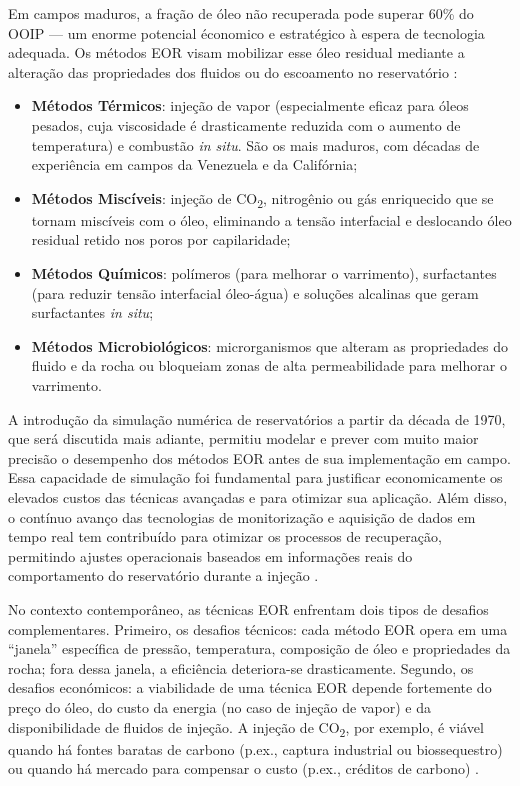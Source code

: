 \documentclass[
  12pt,
  a4paper,
  oneside,
  brazilian,
  sumario=tradicional
]{abntex2}
\begin{document}
Em campos maduros, a fração de óleo não recuperada pode superar 60\%
do OOIP — um enorme potencial économico e estratégico à espera de
tecnologia adequada. Os métodos EOR visam mobilizar esse óleo residual
mediante a alteração das propriedades dos fluidos ou do escoamento no
reservatório \cite{ahmed2010, terry2015}:

\begin{itemize}
  \item \textbf{Métodos Térmicos}: injeção de vapor (especialmente
    eficaz para óleos pesados, cuja viscosidade é drasticamente reduzida
    com o aumento de temperatura) e combustão \textit{in situ}. São os
    mais maduros, com décadas de experiência em campos da Venezuela e
    da Califórnia;
  \item \textbf{Métodos Miscíveis}: injeção de CO\textsubscript{2},
    nitrogênio ou gás enriquecido que se tornam miscíveis com o óleo,
    eliminando a tensão interfacial e deslocando óleo residual retido
    nos poros por capilaridade;
  \item \textbf{Métodos Químicos}: polímeros (para melhorar o varrimento),
    surfactantes (para reduzir tensão interfacial óleo-água) e soluções
    alcalinas que geram surfactantes \textit{in situ};
  \item \textbf{Métodos Microbiológicos}: microrganismos que alteram as
    propriedades do fluido e da rocha ou bloqueiam zonas de alta
    permeabilidade para melhorar o varrimento.
\end{itemize}

A introdução da simulação numérica de reservatórios a partir da década
de 1970, que será discutida mais adiante, permitiu modelar e prever
com muito maior precisão o desempenho dos métodos EOR antes de sua
implementação em campo. Essa capacidade de simulação foi fundamental
para justificar economicamente os elevados custos das técnicas avançadas
e para otimizar sua aplicação. Além disso, o contínuo avanço das
tecnologias de monitorização e aquisição de dados em tempo real tem
contribuído para otimizar os processos de recuperação, permitindo
ajustes operacionais baseados em informações reais do comportamento do
reservatório durante a injeção \cite{terry2015}.

No contexto contemporâneo, as técnicas EOR enfrentam dois tipos de
desafios complementares. Primeiro, os desafios técnicos: cada método EOR
opera em uma ``janela'' específica de pressão, temperatura, composição
de óleo e propriedades da rocha; fora dessa janela, a eficiência
deteriora-se drasticamente. Segundo, os desafios económicos: a viabilidade
de uma técnica EOR depende fortemente do preço do óleo, do custo da
energia (no caso de injeção de vapor) e da disponibilidade de fluidos
de injeção. A injeção de CO\textsubscript{2}, por exemplo, é viável quando
há fontes baratas de carbono (p.ex., captura industrial ou biossequestro)
ou quando há mercado para compensar o custo (p.ex., créditos de carbono)
\cite{lake2007}.
\end{document}
